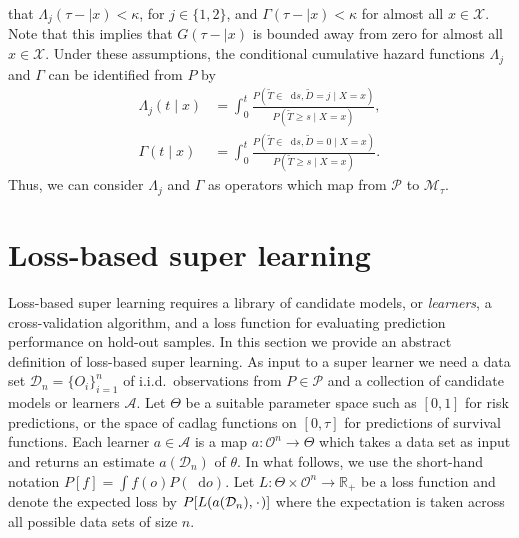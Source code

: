 \documentclass[a4paper,danish]{article}
\theoremstyle{plain} %
\numberwithin{theorem}{section}
\theoremstyle{definition} %
\theoremstyle{remark}
\newcommand{\R}{\mathbb{R}}
\newcommand{\blank}{\makebox[1ex]{\textbf{$\cdot$}}}
\newcommand*\diff{\mathop{}\!\mathrm{d}}
\newcommand{\1}{\mathds{1}}
\newcommand{\data}{\ensuremath{\mathcal{D}}}
\begin{document}
that \(\Lambda_{j}(\tau- \mid x)<\kappa \), for \(j\in\{1,2\}\), and
\(\Gamma(\tau- \mid x)<\kappa\) for almost all \(x\in\mathcal
X\). Note that this implies that \(G(\tau- \mid x)\) is bounded away
from zero for almost all \(x\in\mathcal X\).  Under these assumptions,
the conditional cumulative hazard functions \(\Lambda_{j}\) and
\(\Gamma\) can be identified from \(P\) by
\begin{align}
  \Lambda_{j}(t \mid x) &= \int_0^t\frac{  P(\tilde T \in \diff s, \tilde D=j \mid X=x )}{P(\tilde T \geq s \mid X=x )}, \label{eq:lambdaj}\\
  \Gamma(t \mid x) &= \int_0^t\frac{  P(\tilde T \in \diff s, \tilde D=0 \mid X=x )}{P(\tilde T \geq s \mid X=x )}\label{eq:gamma}.
\end{align}
Thus, we can consider $\Lambda_j$ and \(\Gamma\) as operators which map from
\( \mathcal{P} \) to \(\mathcal M_{\tau}\).

\section{Loss-based super learning}
\label{sec:super-learning}

Loss-based super learning requires a library of candidate models, or
\textit{learners}, a cross-validation algorithm, and a loss function
for evaluating prediction performance on hold-out samples. In this
section we provide an abstract definition of loss-based super
learning.  As input to a super learner we need a data set \(
\data_n=\{O_i\}_{i=1}^n \) of i.i.d.\ observations from \( P \in
\mathcal{P} \) and a collection of candidate models or learners
$\mathcal{A}$. Let \(\Theta\) be a suitable parameter space such as
\([0,1]\) for risk predictions, or the space of cadlag functions on
\([0,\tau]\) for predictions of survival functions.  Each learner \(a
\in \mathcal{A}\) is a map \( a \colon \mathcal{O}^n \rightarrow
\Theta \) which takes a data set as input and returns an estimate
$a(\data_n)$ of $\theta$.   In what follows, we use
the short-hand notation \(P[f] = \int f(o) P(\diff o) \).  Let
\(L\colon \Theta \times \mathcal{O}^n \rightarrow \R_+\) be a loss
function and denote the expected loss by \(P[L(a(\data_n), \blank)]\)
where the expectation is taken across all possible data sets of size
\(n\).
\end{document}
